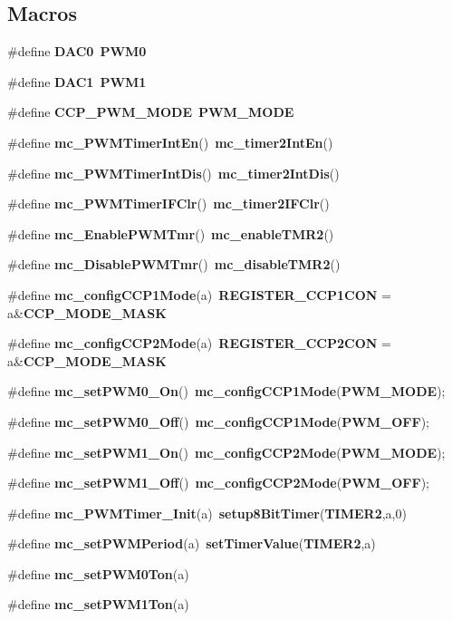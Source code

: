 \subsection*{Macros}
\begin{DoxyCompactItemize}
\item 
\#define {\bf D\-A\-C0}~{\bf P\-W\-M0}
\item 
\#define {\bf D\-A\-C1}~{\bf P\-W\-M1}
\item 
\#define {\bf C\-C\-P\-\_\-\-P\-W\-M\-\_\-\-M\-O\-D\-E}~{\bf P\-W\-M\-\_\-\-M\-O\-D\-E}
\item 
\#define {\bf mc\-\_\-\-P\-W\-M\-Timer\-Int\-En}()~{\bf mc\-\_\-timer2\-Int\-En}()
\item 
\#define {\bf mc\-\_\-\-P\-W\-M\-Timer\-Int\-Dis}()~{\bf mc\-\_\-timer2\-Int\-Dis}()
\item 
\#define {\bf mc\-\_\-\-P\-W\-M\-Timer\-I\-F\-Clr}()~{\bf mc\-\_\-timer2\-I\-F\-Clr}()
\item 
\#define {\bf mc\-\_\-\-Enable\-P\-W\-M\-Tmr}()~{\bf mc\-\_\-enable\-T\-M\-R2}()
\item 
\#define {\bf mc\-\_\-\-Disable\-P\-W\-M\-Tmr}()~{\bf mc\-\_\-disable\-T\-M\-R2}()
\item 
\#define {\bf mc\-\_\-config\-C\-C\-P1\-Mode}(a)~{\bf R\-E\-G\-I\-S\-T\-E\-R\-\_\-\-C\-C\-P1\-C\-O\-N} = a\&{\bf C\-C\-P\-\_\-\-M\-O\-D\-E\-\_\-\-M\-A\-S\-K}
\item 
\#define {\bf mc\-\_\-config\-C\-C\-P2\-Mode}(a)~{\bf R\-E\-G\-I\-S\-T\-E\-R\-\_\-\-C\-C\-P2\-C\-O\-N} = a\&{\bf C\-C\-P\-\_\-\-M\-O\-D\-E\-\_\-\-M\-A\-S\-K}
\item 
\#define {\bf mc\-\_\-set\-P\-W\-M0\-\_\-\-On}()~{\bf mc\-\_\-config\-C\-C\-P1\-Mode}({\bf P\-W\-M\-\_\-\-M\-O\-D\-E});
\item 
\#define {\bf mc\-\_\-set\-P\-W\-M0\-\_\-\-Off}()~{\bf mc\-\_\-config\-C\-C\-P1\-Mode}({\bf P\-W\-M\-\_\-\-O\-F\-F});
\item 
\#define {\bf mc\-\_\-set\-P\-W\-M1\-\_\-\-On}()~{\bf mc\-\_\-config\-C\-C\-P2\-Mode}({\bf P\-W\-M\-\_\-\-M\-O\-D\-E});
\item 
\#define {\bf mc\-\_\-set\-P\-W\-M1\-\_\-\-Off}()~{\bf mc\-\_\-config\-C\-C\-P2\-Mode}({\bf P\-W\-M\-\_\-\-O\-F\-F});
\item 
\#define {\bf mc\-\_\-\-P\-W\-M\-Timer\-\_\-\-Init}(a)~{\bf setup8\-Bit\-Timer}({\bf T\-I\-M\-E\-R2},a,0)
\item 
\#define {\bf mc\-\_\-set\-P\-W\-M\-Period}(a)~{\bf set\-Timer\-Value}({\bf T\-I\-M\-E\-R2},a)
\item 
\#define {\bf mc\-\_\-set\-P\-W\-M0\-Ton}(a)
\item 
\#define {\bf mc\-\_\-set\-P\-W\-M1\-Ton}(a)
\end{DoxyCompactItemize}
